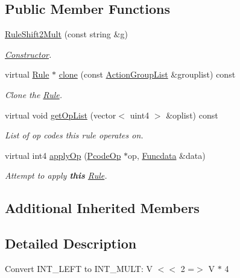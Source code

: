 \subsection*{Public Member Functions}
\begin{DoxyCompactItemize}
\item 
\mbox{\hyperlink{class_rule_shift2_mult_a57d7b7773b652a0e945c00bac697eb08}{Rule\+Shift2\+Mult}} (const string \&g)
\begin{DoxyCompactList}\small\item\em \mbox{\hyperlink{class_constructor}{Constructor}}. \end{DoxyCompactList}\item 
virtual \mbox{\hyperlink{class_rule}{Rule}} $\ast$ \mbox{\hyperlink{class_rule_shift2_mult_a26da49bb955581c220a082aae5e8f546}{clone}} (const \mbox{\hyperlink{class_action_group_list}{Action\+Group\+List}} \&grouplist) const
\begin{DoxyCompactList}\small\item\em Clone the \mbox{\hyperlink{class_rule}{Rule}}. \end{DoxyCompactList}\item 
virtual void \mbox{\hyperlink{class_rule_shift2_mult_aea2c1542a1d7c6e133e4340828fc6507}{get\+Op\+List}} (vector$<$ uint4 $>$ \&oplist) const
\begin{DoxyCompactList}\small\item\em List of op codes this rule operates on. \end{DoxyCompactList}\item 
virtual int4 \mbox{\hyperlink{class_rule_shift2_mult_a72b5072e94341325dd65f0d48dbb2a04}{apply\+Op}} (\mbox{\hyperlink{class_pcode_op}{Pcode\+Op}} $\ast$op, \mbox{\hyperlink{class_funcdata}{Funcdata}} \&data)
\begin{DoxyCompactList}\small\item\em Attempt to apply {\bfseries{this}} \mbox{\hyperlink{class_rule}{Rule}}. \end{DoxyCompactList}\end{DoxyCompactItemize}
\subsection*{Additional Inherited Members}


\subsection{Detailed Description}
Convert I\+N\+T\+\_\+\+L\+E\+FT to I\+N\+T\+\_\+\+M\+U\+LT\+: {\ttfamily V $<$$<$ 2 =$>$ V $\ast$ 4} 

